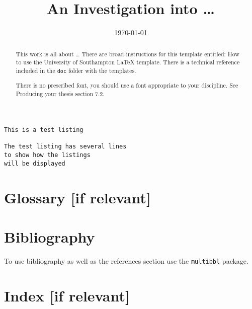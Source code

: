 \documentclass[sotoncolour]{uosthesis}      %
\title      {An Investigation into \dots}
\date       {\today}
\begin{document}
\copyrightDeclaration{} %
\raggedright                  %
\frontmatter
\maketitle
\begin{abstract}
This work is all about \dots
There are broad instructions for this template entitled: How to use the University of Southampton LaTeX template. There is a technical reference included in the \texttt{doc} folder with the templates.

There is no prescribed font, you should use a font appropriate to your discipline.  See Producing your thesis section 7.2.
\end{abstract}
\tableofcontents
\listoffigures
\listoftables
\lstlistoflistings
\listofaddmaterial
{}
\mainmatter


\begin{lstlisting}[caption=Listing of what an example listing would be like]
This is a test listing

The test listing has several lines
to show how the listings
will be displayed
\end{lstlisting}
\appendix

\backmatter
\chapter{Glossary [if relevant]}


\chapter{Bibliography}
To use bibliography as well as the references section use the \texttt{multibbl} package.
\chapter{Index [if relevant]}
\end{document}
